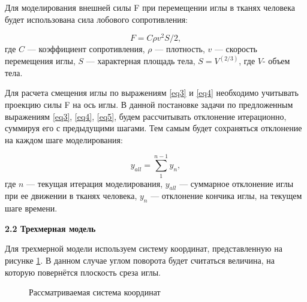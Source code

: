 \documentclass[10pt]{article}
\begin{document}
Для моделирования внешней силы F при перемещении иглы в тканях человека будет использована сила лобового сопротивления:

\begin{equation} \label{eq5}
F = C \rho v^2 S /2, 
\end{equation}
где $C$ --- коэффициент сопротивления, $\rho$ --- плотность, $v$ --- скорость перемещения иглы, $S$ --- характерная площадь тела, $S = V^{(2/3)}$, где $V$- объем тела.

Для расчета смещения иглы по выражениям \eqref{eq3} и \eqref{eq4} необходимо учитывать проекцию силы F на ось иглы.
В данной постановке задачи по предложенным выражениям \eqref{eq3}, \eqref{eq4}, \eqref{eq5}, будем рассчитывать отклонение итерационно, суммируя его с предыдущими шагами. Тем самым будет сохраняться отклонение на каждом шаге моделирования:

\begin{equation} \label{eq6}
y_{all} = \sum\limits_{1}^{n-1} y_{n},
\end{equation}
где $n$ --- текущая итерация моделирования, $y_{all}$ --- суммарное отклонение иглы при ее движении в тканях человека, $y_{n}$ --- отклонение кончика иглы, на текущем шаге времени.


\bigskip
\textbf{2.2 Трехмерная модель}

Для трехмерной модели используем систему координат, представленную на рисунке \ref{n2}. В данном случае углом поворота будет считаться величина, на которую повернётся плоскость среза иглы.

\begin{figure}[h]
\caption{Рассматриваемая система координат}
\label{n2}
\end{figure}
\end{document}
